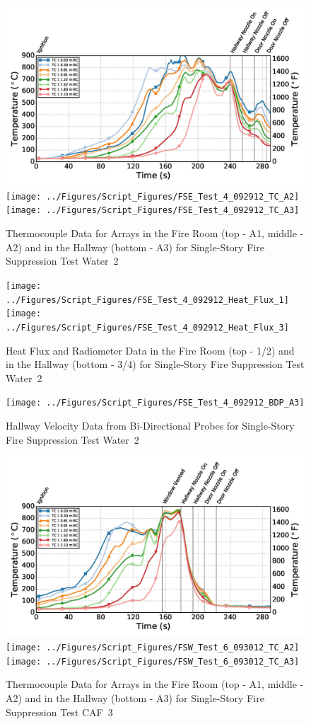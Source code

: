 \documentclass[12pt,oneside]{book}
\begin{document}
\begin{figure}[ht]
\includegraphics[width=.725\columnwidth]{../Figures/Script_Figures/FSE_Test_4_092912_TC_A1}
\texttt{[image: ../Figures/Script\_Figures/FSE\_Test\_4\_092912\_TC\_A2]}
\texttt{[image: ../Figures/Script\_Figures/FSE\_Test\_4\_092912\_TC\_A3]}
\caption{Thermocouple Data for Arrays in the Fire Room (top - A1, middle - A2) and in the Hallway (bottom - A3) for Single-Story Fire Suppression Test Water~2}
\end{figure}

\begin{figure}[ht]
\texttt{[image: ../Figures/Script\_Figures/FSE\_Test\_4\_092912\_Heat\_Flux\_1]}
\texttt{[image: ../Figures/Script\_Figures/FSE\_Test\_4\_092912\_Heat\_Flux\_3]}
\caption{Heat Flux and Radiometer Data in the Fire Room (top - 1/2) and in the Hallway (bottom - 3/4) for Single-Story Fire Suppression Test Water~2}
\end{figure}

\begin{figure}[ht]
\texttt{[image: ../Figures/Script\_Figures/FSE\_Test\_4\_092912\_BDP\_A3]}
\caption{Hallway Velocity Data from Bi-Directional Probes for Single-Story Fire Suppression Test Water~2}
\end{figure}

\begin{figure}[ht]
\includegraphics[width=.725\columnwidth]{../Figures/Script_Figures/FSW_Test_6_093012_TC_A1}
\texttt{[image: ../Figures/Script\_Figures/FSW\_Test\_6\_093012\_TC\_A2]}
\texttt{[image: ../Figures/Script\_Figures/FSW\_Test\_6\_093012\_TC\_A3]}
\caption{Thermocouple Data for Arrays in the Fire Room (top - A1, middle - A2) and in the Hallway (bottom - A3) for Single-Story Fire Suppression Test CAF~3}
\end{figure}
\end{document}
